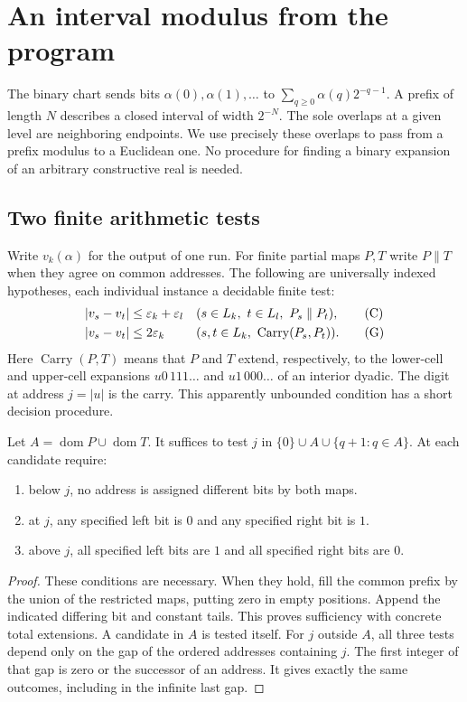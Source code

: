 \section{An interval modulus from the program}
\label{sec:interval}
The binary chart sends bits $\alpha(0),\alpha(1),\ldots$ to $\sum_{q\ge0}\alpha(q)2^{-q-1}$. A prefix of length $N$ describes a closed interval of width $2^{-N}$. The sole overlaps at a given level are neighboring endpoints. We use precisely these overlaps to pass from a prefix modulus to a Euclidean one. No procedure for finding a binary expansion of an arbitrary constructive real is needed.

\subsection{Two finite arithmetic tests}
Write $v_k(\alpha)$ for the output of one run. For finite partial maps $P,T$ write $P\parallel T$ when they agree on common addresses. The following are universally indexed hypotheses, each individual instance a decidable finite test:
\begin{align}
 |v_s-v_t| &\le \varepsilon_k+\varepsilon_l
 &&(s\in L_k,\ t\in L_l,\ P_s\parallel P_t), \tag{C}\label{eq:C}\\
 |v_s-v_t| &\le 2\varepsilon_k
 &&(s,t\in L_k,\ \operatorname{Carry}(P_s,P_t)). \tag{G}\label{eq:G}
\end{align}
Here $\operatorname{Carry}(P,T)$ means that $P$ and $T$ extend, respectively, to the lower-cell and upper-cell expansions $u0\,111\ldots$ and $u1\,000\ldots$ of an interior dyadic. The digit at address $j=|u|$ is the carry. This apparently unbounded condition has a short decision procedure.

\begin{lemma}\label{lem:carry}
Let $A=\operatorname{dom}P\cup\operatorname{dom}T$. It suffices to test $j$ in
$\{0\}\cup A\cup\{q+1:q\in A\}$. At each candidate require:
\begin{enumerate}[label=(\roman*),leftmargin=24pt]
\item below $j$, no address is assigned different bits by both maps.
\item at $j$, any specified left bit is $0$ and any specified right bit is $1$.
\item above $j$, all specified left bits are $1$ and all specified right bits are $0$.
\end{enumerate}
\end{lemma}
\begin{proof}
These conditions are necessary. When they hold, fill the common prefix by the union of the restricted maps, putting zero in empty positions. Append the indicated differing bit and constant tails. This proves sufficiency with concrete total extensions. A candidate in $A$ is tested itself. For $j$ outside $A$, all three tests depend only on the gap of the ordered addresses containing $j$. The first integer of that gap is zero or the successor of an address. It gives exactly the same outcomes, including in the infinite last gap.
\end{proof}

